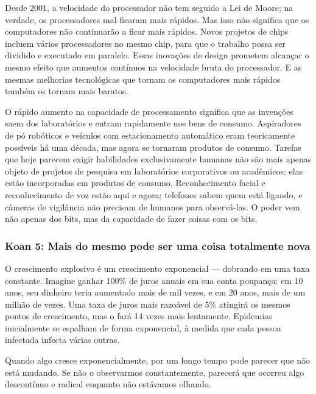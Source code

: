 Desde 2001, a velocidade do processador não tem seguido a Lei de Moore; na 
verdade, os processadores mal ficaram mais rápidos. Mas isso não significa que 
os computadores não continuarão a ficar mais rápidos. Novos projetos de chips 
incluem vários processadores no mesmo chip, para que o trabalho possa ser 
dividido e executado em paralelo. Essas inovações de design prometem alcançar o 
mesmo efeito que aumentos contínuos na velocidade bruta do processador. E as 
mesmas melhorias tecnológicas que tornam os computadores mais rápidos também os 
tornam mais baratos.

O rápido aumento na capacidade de processamento significa que as invenções saem 
dos laboratórios e entram rapidamente nos bens de consumo. Aspiradores de pó 
robóticos e veículos com estacionamento automático eram teoricamente possíveis 
há uma década, mas agora se tornaram produtos de consumo. Tarefas que hoje 
parecem exigir habilidades exclusivamente humanas não são mais apenas objeto de 
projetos de pesquisa em laboratórios corporativos ou acadêmicos; elas estão 
incorporadas em produtos de consumo. Reconhecimento facial e reconhecimento de 
voz estão aqui e agora; telefones sabem quem está ligando, e câmeras de 
vigilância não precisam de humanos para observá-las. O poder vem não apenas dos 
bits, mas da capacidade de fazer coisas com os bits.


\subsubsection*{Koan 5: Mais do mesmo pode ser uma coisa totalmente nova}
O crescimento explosivo é um crescimento exponencial --- dobrando em uma taxa 
constante. Imagine ganhar 100\% de juros anuais em sua conta poupança: em 10 
anos, seu dinheiro teria aumentado mais de mil vezes, e em 20 anos, mais de um 
milhão de vezes. Uma taxa de juros mais razoável de 5\% atingirá os mesmos 
pontos de crescimento, mas o fará 14 vezes mais lentamente. Epidemias 
inicialmente se espalham de forma exponencial, à medida que cada pessoa 
infectada infecta várias outras.

Quando algo cresce exponencialmente, por um longo tempo pode parecer que não 
está mudando. Se não o observarmos constantemente, parecerá que ocorreu algo 
descontínuo e radical enquanto não estávamos olhando.

